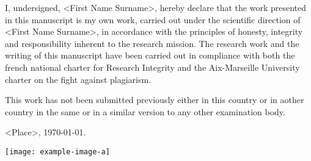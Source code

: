 	I, undersigned,
	<First Name Surname>,
	hereby declare that the work presented in this manuscript is my own work, 
	carried out under the scientific direction of
	<First Name Surname>,
	in accordance with the principles of honesty, integrity and responsibility 
	inherent to the research mission. The research work and the writing of this 
	manuscript have been carried out in compliance with both the french 
	national charter for Research Integrity and the Aix-Marseille University 
	charter on the fight against plagiarism.
	
	This work has not been submitted previously either in this country or in 
	aother country in the same or in a similar version to any other examination 
	body.
	
	<Place>, \today.
	
	\begin{flushright}
	\texttt{[image: example-image-a]}
	\end{flushright}
\fi

%
